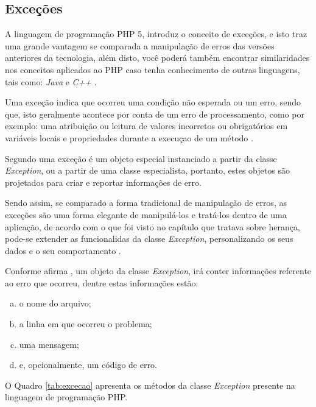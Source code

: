 \subsection{Exceções}

A linguagem de programação \acs{PHP} 5, introduz o conceito de exceções, e isto traz
uma grande vantagem se comparada a manipulação de erros das versões anteriores
da tecnologia, além disto, você poderá também encontrar similaridades nos
conceitos aplicados ao \acs{PHP} caso tenha conhecimento de outras linguagens, tais
como: \textit{Java} e \textit{C++} \cite{phpObjectsPatternsAndPractice}.

Uma exceção indica que ocorreu uma condição não esperada ou um erro, sendo que,
isto geralmente acontece por conta de um erro de processamento, como por
exemplo: uma atribuição ou leitura de valores incorretos ou obrigatórios em
variáveis locais e propriedades durante a execuçao de um método \cite{learningJava}.

Segundo  uma exceção é um objeto
especial instanciado a partir da classe \textit{Exception}, ou a partir de uma
classe especialista, portanto, estes objetos são projetados para criar e
reportar informações de erro.

Sendo assim, se comparado a forma tradicional de manipulação de erros, as
exceções são uma forma elegante de manipulá-los e tratá-los dentro de uma
aplicação, de acordo com o que foi visto no capítulo que
tratava sobre herança, pode-se extender as funcionalidas da classe
\textit{Exception}, personalizando os seus dados e o seu comportamento \cite{phpMasterWriteCuttingEdgeCode}.

Conforme afirma , um objeto da classe
\textit{Exception}, irá conter informações referente ao erro que ocorreu, dentre
estas informações estão:

\begin{enumerate}[a)]
    \item o nome do arquivo;
    \item a linha em que ocorreu o problema;
    \item uma mensagem;
    \item e, opcionalmente, um código de erro.
\end{enumerate}

O Quadro \ref{tab:excecao} apresenta os métodos da classe \textit{Exception}
presente na linguagem de programação \acs{PHP}.

